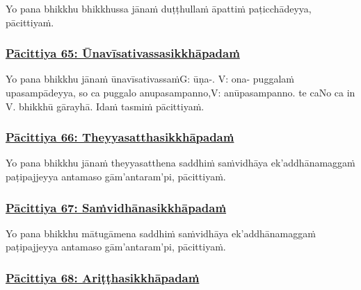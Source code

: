 Yo pana bhikkhu bhikkhussa jānaṁ duṭṭhullaṁ āpattiṁ paṭicchādeyya, pācittiyaṁ.



\subsubsection*{\hyperref[exp65]{Pācittiya 65: Ūnavīsativassasikkhāpadaṁ}}
\label{pac65}

Yo pana bhikkhu jānaṁ ūnavīsativassaṁ\makeatletter\hyperlink{endnote-appendix}\makeatother G: ūṇa-. V: ona- puggalaṁ upasampādeyya, so ca puggalo anupasampanno,\makeatletter\hyperlink{endnote-appendix}\makeatother V: anūpasampanno. te ca\makeatletter\hyperlink{endnote-appendix}\makeatother No ca in V. bhikkhū gārayhā. Idaṁ tasmiṁ pācittiyaṁ.



\subsubsection*{\hyperref[exp66]{Pācittiya 66: Theyyasatthasikkhāpadaṁ}}
\label{pac66}

Yo pana bhikkhu jānaṁ theyyasatthena saddhiṁ saṁvidhāya ek'addhānamaggaṁ paṭipajjeyya antamaso gām'antaram'pi, pācittiyaṁ.



\subsubsection*{\hyperref[exp67]{Pācittiya 67: Saṁvidhānasikkhāpadaṁ}}
\label{pac67}

Yo pana bhikkhu mātugāmena saddhiṁ saṁvidhāya ek'addhānamaggaṁ paṭipajjeyya antamaso gām'antaram'pi, pācittiyaṁ.



\subsubsection*{\hyperref[exp68]{Pācittiya 68: Ariṭṭhasikkhāpadaṁ}}
\label{pac68}

